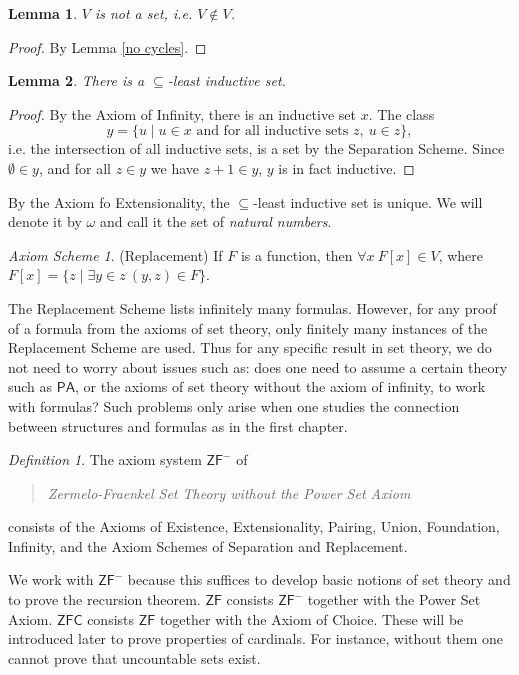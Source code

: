 \documentclass[a4paper, 11pt]{amsart}
\newtheorem{lemma}[lemma]{Lemma}
\theoremstyle{remark}
\newtheorem{definition}[definition]{Definition}
\newtheorem*{axiomscheme}{Axiom Scheme}
\newcommand{\axiomft}[1]{\mathsf{#1}}
\newcommand{\PA}{\axiomft{PA}}
\newcommand{\ZFC}{\axiomft{ZFC}}
\newcommand{\ZF}{\axiomft{ZF}}
\begin{document}
\begin{lemma} 
$V$ is not a set, i.e. $V\notin V$. 
\end{lemma} 
\begin{proof} 
By Lemma \ref{no cycles}. 
\end{proof} 

\begin{lemma} 
There is a $\subseteq$-least inductive set. 
\end{lemma} 
\begin{proof} 
By the Axiom of Infinity, there is an inductive set $x$. 
The class 
$$ y= \{u\mid u\in x \text{ and for all inductive sets } z,\ u\in z\},$$ 
i.e. the intersection of all inductive sets, is a set by the Separation Scheme. 
Since $\emptyset\in y$, and for all $z\in y$ we have $z+1\in y$, $y$ is in fact inductive. 
\end{proof} 

By the Axiom fo Extensionality, the $\subseteq$-least inductive set is unique. 
We will denote it by $\omega$ and call it the set of \emph{natural numbers}. 

\begin{axiomscheme}(Replacement) 
If $F$ is a function, then $\forall x\ F[x]\in V$, where $F[x]=\{z\mid \exists y\in z\ (y,z)\in F\}$. 
\end{axiomscheme} 

The Replacement Scheme lists infinitely many formulas. 
However, for any proof of a formula from the axioms of set theory, only finitely many instances of the Replacement Scheme are used. 
Thus for any specific result in set theory, we do not need to worry about issues such as: does one need to assume a certain theory such as $\PA$, or the axioms of set theory without the axiom of infinity, to work with formulas? 
Such problems only arise when one studies the connection between structures and formulas as in the first chapter. 

\begin{definition} 
The axiom system $\ZF^-$ of 
\begin{quote} 
\emph{Zermelo-Fraenkel Set Theory without the Power Set Axiom} 
\end{quote} 
consists of the Axioms of Existence, Extensionality, Pairing, Union, Foundation, Infinity, and the Axiom Schemes of Separation and Replacement.  
\end{definition} 

We work with $\ZF^-$ because this suffices to develop basic notions of set theory and to prove the recursion theorem. 
$\ZF$ consists $\ZF^-$ together with the Power Set Axiom. 
$\ZFC$ consists $\ZF$ together with the Axiom of Choice. 
These will be introduced later to prove properties of cardinals. 
For instance, without them one cannot prove that uncountable sets exist. 
\end{document}

